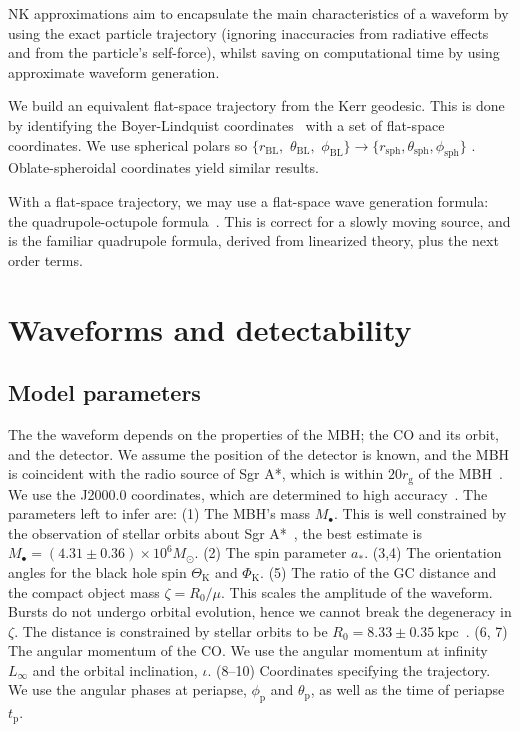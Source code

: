 \documentclass[11pt,twoside]{article}
\begin{document}
NK approximations aim to encapsulate the main characteristics of a waveform by using the exact particle trajectory (ignoring inaccuracies from radiative effects and from the particle's self-force), whilst saving on computational time by using approximate waveform generation.

We build an equivalent flat-space trajectory from the Kerr geodesic. This is done by identifying the Boyer-Lindquist coordinates~\citep{Boyer1967} with a set of flat-space coordinates. We use spherical polars so $\{r_\mathrm{BL},$ $\theta_\mathrm{BL},$ $\phi_\mathrm{BL}\} \rightarrow \{r_\mathrm{sph}, \theta_\mathrm{sph}, \phi_\mathrm{sph}\}$ \citep*{Gair2005}. Oblate-spheroidal coordinates yield similar results.

With a flat-space trajectory, we may use a flat-space wave generation formula: the quadrupole-octupole formula~\citep{Bekenstein1973, Press1977, Yunes2008}. This is correct for a slowly moving source, and is the familiar quadrupole formula, derived from linearized theory, plus the next order terms.  

\section{Waveforms and detectability}\label{sec:Waveforms}

\subsection{Model parameters}

The the waveform depends on the properties of the MBH; the CO and its orbit, and the detector. We assume the position of the detector is known, and the MBH is coincident with the radio source of Sgr A*, which is within $20 r_\mathrm{g}$ of the MBH~\citep{Reid2003,Doeleman2008}. We use the J2000.0 coordinates, which are determined to high accuracy~\citep{Reid1999, Yusef-Zadeh1999}. The parameters left to infer are: (1) The MBH's mass $M_\bullet$. This is well constrained by the observation of stellar orbits about Sgr A*~\citep{Ghez2008, Gillessen2009}, the best estimate is $M_\bullet = (4.31 \pm 0.36) \times 10^6 M_\odot$. (2) The spin parameter $a_\ast$. (3,4) The orientation angles for the black hole spin $\Theta_\mathrm{K}$ and $\Phi_\mathrm{K}$. (5) The ratio of the GC distance and the compact object mass $\zeta = R_0/\mu$. This scales the amplitude of the waveform. Bursts do not undergo orbital evolution, hence we cannot break the degeneracy in $\zeta$. The distance is constrained by stellar orbits to be $R_0 = 8.33 \pm 0.35~\mathrm{kpc}$~\citep{Gillessen2009}. (6, 7) The angular momentum of the CO. We use the angular momentum at infinity $L_\infty$ and the orbital inclination, $\iota$. (8--10) Coordinates specifying the trajectory. We use the angular phases at periapse, $\phi_\mathrm{p}$ and $\theta_\mathrm{p}$, as well as the time of periapse $t_\mathrm{p}$.
\end{document}
